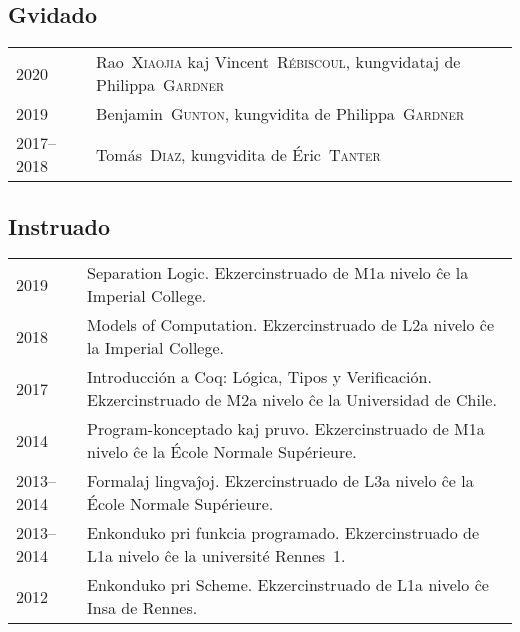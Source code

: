 \documentclass[12pt,a4paper]{article}
\makeatletter
\newcommand{\en}[1]{\foreignlanguage{english}{{#1}}}
\newcommand{\fr}[1]{\foreignlanguage{french}{{#1}}}
\newcommand{\es}[1]{\foreignlanguage{spanish}{{#1}}}
\newcommand{\en}[1]{\foreignlanguage{english}{{#1}}}
\newcommand{\fr}[1]{\foreignlanguage{french}{{#1}}}
\newcommand{\es}[1]{\foreignlanguage{spanish}{{#1}}}
\newenvironment{datecvsection}[1]%
               {\subsection*{#1}%
                 \noindent \begin{tabular}{@{}p{\annee}p{\texte}@{}}}
               {\end{tabular}}
\newcommand\familyName{\textsc}
\newcommand\placeName{}
\makeatother
\begin{document}
\begin{datecvsection}{Gvidado}

  2020 & Rao~\familyName{Xiaojia} kaj Vincent~\familyName{Rébiscoul}, kungvidataj de Philippa~\familyName{Gardner} \\
    2019 & Benjamin~\familyName{Gunton}, kungvidita de Philippa~\familyName{Gardner} \\
    2017–2018 & Tomás~\familyName{Diaz}, kungvidita de Éric~\familyName{Tanter} \\

\end{datecvsection}

\begin{datecvsection}{Instruado}

    2019 & Separation Logic. Ekzercinstruado de M1a nivelo ĉe la \en{\placeName{Imperial College}}. \\

    2018 & Models of Computation. Ekzercinstruado de L2a nivelo ĉe la \en{\placeName{Imperial College}}. \\

    2017 & Introducción a Coq: Lógica, Tipos y Verificación. Ekzercinstruado de M2a nivelo ĉe la \es{\placeName{Universidad de Chile}}. \\

    2014 & Program-konceptado kaj pruvo. Ekzercinstruado de M1a nivelo ĉe la \fr{\placeName{École Normale Supérieure}}. \\

    2013–2014 & Formalaj lingvaĵoj. Ekzercinstruado de L3a nivelo ĉe la \fr{\placeName{École Normale Supérieure}}. \\

    2013–2014 & Enkonduko pri funkcia programado. Ekzercinstruado de L1a nivelo ĉe la \fr{université \placeName{Rennes}~1}. \\

    2012 & Enkonduko pri Scheme. Ekzercinstruado de L1a nivelo ĉe \placeName{Insa} de \placeName{Rennes}. \\

\end{datecvsection}
\end{document}
